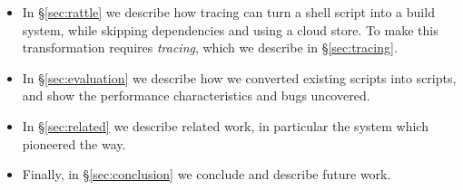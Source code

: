 \begin{itemize}
\item In \S\ref{sec:rattle} we describe how tracing can turn a shell script into a build system, while skipping dependencies and using a cloud store. To make this transformation requires \emph{tracing}, which we describe in \S\ref{sec:tracing}. %
\item In \S\ref{sec:evaluation} we describe how we converted existing \Make scripts into \Rattle scripts, and show the performance characteristics and bugs uncovered.
\item In \S\ref{sec:related} we describe related work, in particular the \Fabricate system which pioneered the way.
\item Finally, in \S\ref{sec:conclusion} we conclude and describe future work.
\end{itemize}
